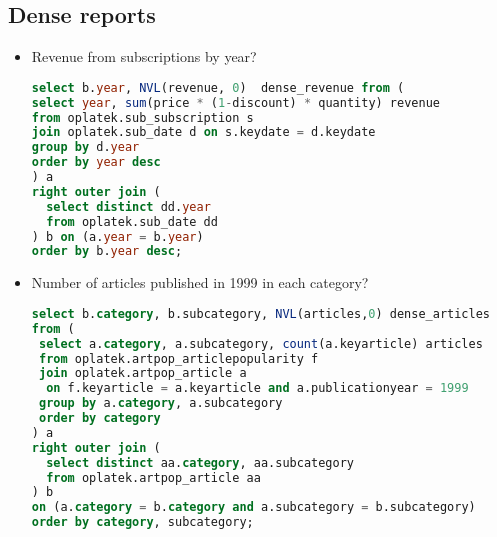 \subsection{Dense reports} %
\label{sub:Dense reports}
\begin{itemize}
\item Revenue from subscriptions by year?
\begin{lstlisting}[language=sql] 
select b.year, NVL(revenue, 0)  dense_revenue from (
select year, sum(price * (1-discount) * quantity) revenue 
from oplatek.sub_subscription s 
join oplatek.sub_date d on s.keydate = d.keydate 
group by d.year 
order by year desc
) a
right outer join (
  select distinct dd.year
  from oplatek.sub_date dd
) b on (a.year = b.year)
order by b.year desc;
\end{lstlisting}

\item Number of articles published in 1999 in each category?
\begin{lstlisting}[language=sql] 
select b.category, b.subcategory, NVL(articles,0) dense_articles 
from (
 select a.category, a.subcategory, count(a.keyarticle) articles
 from oplatek.artpop_articlepopularity f
 join oplatek.artpop_article a 
  on f.keyarticle = a.keyarticle and a.publicationyear = 1999
 group by a.category, a.subcategory
 order by category
) a
right outer join (
  select distinct aa.category, aa.subcategory
  from oplatek.artpop_article aa
) b 
on (a.category = b.category and a.subcategory = b.subcategory)
order by category, subcategory;
\end{lstlisting}
\end{itemize}

